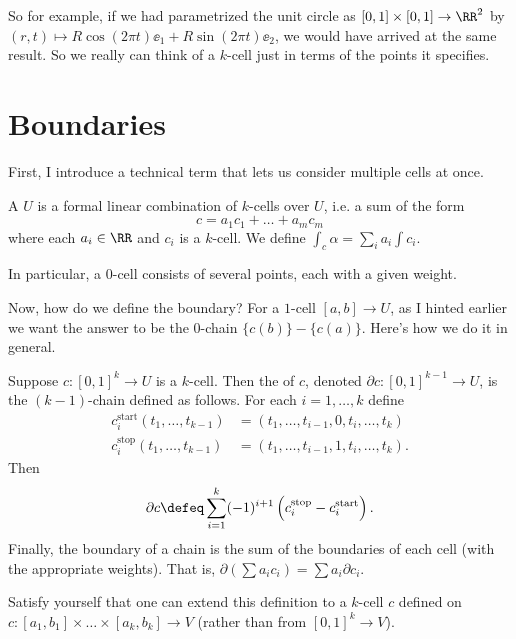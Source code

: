 So for example, if we had parametrized the unit circle as $[0,1] \times [0,1] \to \RR^2$
by $(r,t) \mapsto R\cos(2\pi t) \ee_1 + R\sin(2\pi t) \ee_2$, we would have arrived at the same result.
So we really can think of a $k$-cell just in terms of the points it specifies.

\section{Boundaries}
First, I introduce a technical term that lets us consider multiple cells at once.
\begin{definition}
	A  $U$ is a formal linear combination of $k$-cells over $U$,
	i.e. a sum of the form
	\[ c = a_1 c_1 + \dots + a_m c_m \]
	where each $a_i \in \RR$ and $c_i$ is a $k$-cell.
	We define $\int_c \alpha = \sum_i a_i \int c_i$.
\end{definition}
In particular, a $0$-cell consists of several points, each with a given weight.

Now, how do we define the boundary?
For a $1$-cell $[a,b] \to U$, as I hinted earlier we want the answer to be the $0$-chain $\{c(b)\}-\{c(a)\}$.
Here's how we do it in general.
\begin{definition}
	Suppose $c : [0,1]^k \to U$ is a $k$-cell.
	Then the  of $c$, denoted $\partial c : [0,1]^{k-1} \to U$,
	is the $(k-1)$-chain defined as follows.
	For each $i = 1,\dots,k$ define
	\begin{align*}
		c_i^{\text{start}}(t_1, \dots, t_{k-1}) &
		= (t_1, \dots, t_{i-1}, 0, t_i, \dots, t_k) \\
		c_i^{\text{stop}}(t_1, \dots, t_{k-1}) &
		= (t_1, \dots, t_{i-1}, 1, t_i, \dots, t_k).
	\end{align*}
	Then
	\[ \partial c \defeq
	\sum_{i=1}^k (-1)^{i+1} \left( c_i^{\text{stop}} - c_i^{\text{start}}  \right). \]
	Finally, the boundary of a chain is the sum of the boundaries of each cell (with the appropriate weights).
	That is, $\partial(\sum a_ic_i) = \sum a_i \partial c_i$.
\end{definition}
\begin{ques}
	Satisfy yourself that one can extend this definition to
	a $k$-cell $c$ defined on $c : [a_1, b_1] \times \dots \times [a_k, b_k] \to V$
	(rather than from $[0,1]^k \to V$).
\end{ques}

